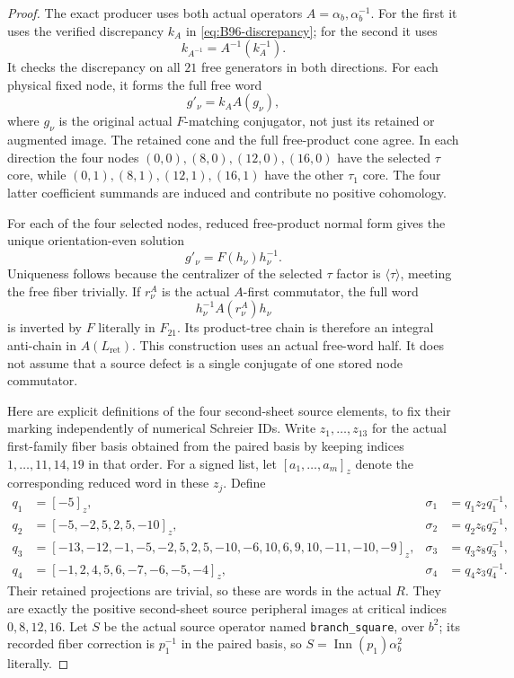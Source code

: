\begin{proof}
The exact producer
uses both actual operators $A=\alpha_b,\alpha_b^{-1}$.
For the first it uses the verified discrepancy $k_A$ in
\eqref{eq:B96-discrepancy}; for the second it uses
\[
             k_{A^{-1}}=A^{-1}(k_A^{-1}).
\]
It checks the discrepancy on all $21$ free generators in both
directions.  For each physical fixed node, it forms the full
free word
\[
                 g'_\nu=k_A A(g_\nu),
\]
where $g_\nu$ is the original actual $F$-matching conjugator,
not just its retained or augmented image.  The retained cone
and the full free-product cone agree.  In each direction the
four nodes $(0,0),(8,0),(12,0),(16,0)$ have the selected
$\tau$ core, while $(0,1),(8,1),(12,1),(16,1)$ have the
other $\tau_1$ core.  The four latter coefficient summands
are induced and contribute no positive cohomology.

For each of the four selected nodes, reduced free-product
normal form gives the unique orientation-even solution
\begin{equation}\label{eq:B96-odd-half}
                    g'_\nu=F(h_\nu)h_\nu^{-1}.
\end{equation}
Uniqueness follows because the centralizer of the selected
$\tau$ factor is $\langle\tau\rangle$, meeting the free fiber
trivially.  If $r_\nu^A$ is the actual $A$-first commutator,
the full word
\begin{equation}\label{eq:B96-odd-antiword}
                 h_\nu^{-1}A(r_\nu^A)h_\nu
\end{equation}
is inverted by $F$ literally in $F_{21}$.  Its product-tree
chain is therefore an integral anti-chain in $A(L_{\mathrm{ret}})$.
This construction uses an actual free-word half.  It does not
assume that a source defect is a single conjugate of one stored
node commutator.

Here are explicit definitions of the four second-sheet source
elements, to fix their marking independently of numerical
Schreier IDs.  Write $z_1,\ldots,z_{13}$ for the actual first-family
fiber basis obtained from the paired basis by keeping indices
$1,\ldots,11,14,19$ in that order.  For a signed list, let
$[a_1,\ldots,a_m]_z$ denote the corresponding reduced word in
these $z_j$.  Define
\begin{equation}\label{eq:B96-second-source}
 \begin{aligned}
 q_1&=[-5]_z,&\sigma_1&=q_1z_2q_1^{-1},\\
 q_2&=[-5,-2,5,2,5,-10]_z,&\sigma_2&=q_2z_6q_2^{-1},\\
 q_3&=[-13,-12,-1,-5,-2,5,2,5,-10,-6,10,6,9,10,-11,-10,-9]_z,
       &\sigma_3&=q_3z_8q_3^{-1},\\
 q_4&=[-1,2,4,5,6,-7,-6,-5,-4]_z,
       &\sigma_4&=q_4z_3q_4^{-1}.
 \end{aligned}
\end{equation}
Their retained projections are trivial, so these are words in
the actual $R$.  They are exactly the positive second-sheet
source peripheral images at critical indices $0,8,12,16$.
Let $S$ be the actual source operator named
\texttt{branch\_square}, over $b^2$; its recorded fiber correction
is $p_1^{-1}$ in the paired basis, so
$S=\operatorname{Inn}(p_1)\alpha_b^2$ literally.


\end{proof}
